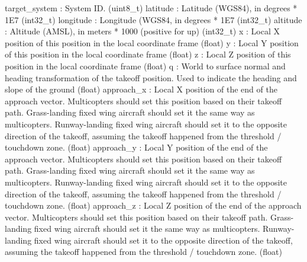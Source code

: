 \begin{DoxyVerb}
\begin{DoxyVerb}
\begin{DoxyVerb}
\begin{DoxyVerb}
\begin{DoxyVerb}
\begin{DoxyVerb}
\begin{DoxyVerb}
\begin{DoxyVerb}
\begin{DoxyVerb}
\begin{DoxyVerb}
\begin{DoxyVerb}
target_system             : System ID. (uint8_t)
latitude                  : Latitude (WGS84), in degrees * 1E7 (int32_t)
longitude                 : Longitude (WGS84, in degrees * 1E7 (int32_t)
altitude                  : Altitude (AMSL), in meters * 1000 (positive for up) (int32_t)
x                         : Local X position of this position in the local coordinate frame (float)
y                         : Local Y position of this position in the local coordinate frame (float)
z                         : Local Z position of this position in the local coordinate frame (float)
q                         : World to surface normal and heading transformation of the takeoff position. Used to indicate the heading and slope of the ground (float)
approach_x                : Local X position of the end of the approach vector. Multicopters should set this position based on their takeoff path. Grass-landing fixed wing aircraft should set it the same way as multicopters. Runway-landing fixed wing aircraft should set it to the opposite direction of the takeoff, assuming the takeoff happened from the threshold / touchdown zone. (float)
approach_y                : Local Y position of the end of the approach vector. Multicopters should set this position based on their takeoff path. Grass-landing fixed wing aircraft should set it the same way as multicopters. Runway-landing fixed wing aircraft should set it to the opposite direction of the takeoff, assuming the takeoff happened from the threshold / touchdown zone. (float)
approach_z                : Local Z position of the end of the approach vector. Multicopters should set this position based on their takeoff path. Grass-landing fixed wing aircraft should set it the same way as multicopters. Runway-landing fixed wing aircraft should set it to the opposite direction of the takeoff, assuming the takeoff happened from the threshold / touchdown zone. (float)\end{DoxyVerb}
 \mbox{\label{classpymavlink_1_1dialects_1_1v10_1_1MAVLink_abedd948825bfefedce2c5b32b905ba22}} 

\end{DoxyVerb}
\end{DoxyVerb}
\end{DoxyVerb}
\end{DoxyVerb}
\end{DoxyVerb}
\end{DoxyVerb}
\end{DoxyVerb}
\end{DoxyVerb}
\end{DoxyVerb}
\end{DoxyVerb}
